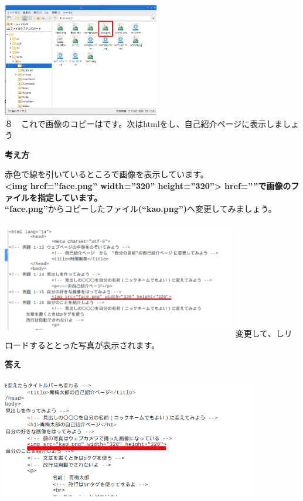 \documentclass[a4paper,12pt]{jarticle}
\begin{document}
\begin{minipage}{0.45\linewidth}
  \includegraphics[width=\linewidth,height=5cm]{textbook-img170.png}\\
  ８　これで画像のコピーはです。次はhtmlをし、自己紹介ページに表示しましょう
\end{minipage}

\clearpage
\flushleft
\textbf{考え方}\ \


赤色で線を引いているところで画像を表示しています。\\
\textbf{{\textless}img href=”face.png” width=”320” height=”320”{\textgreater}}
\textbf{href=””で画像のファイルを指定しています。}\\
\textbf{“face.png”}からコピーしたファイル\textbf{(“kao.png”)}へ変更してみましょう。

\begin{minipage}{16.576cm}
  \includegraphics[width=10.296cm,height=5.145cm]{textbook-img171.png}
  \newline
  変更して、しリロードするととった写真が表示されます。
\end{minipage}

\flushleft
\textbf{答え}

\includegraphics[width=11.255cm,height=5.482cm]{textbook-img172.png}
\end{document}
